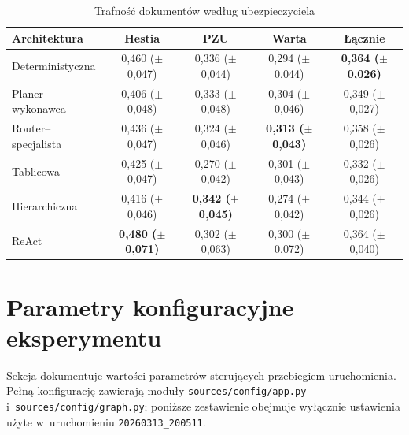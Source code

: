   \begin{table}[H]
    \caption{Trafność dokumentów według ubezpieczyciela}\label{tab:trafnosc-ubezpieczyciel}
    \centering
    \small
    \renewcommand{\arraystretch}{1.3}
    \begin{tabular}{@{} l c c c c @{}}
      \toprule
      \textbf{Architektura}
      & \textbf{Hestia}
      & \textbf{PZU}
      & \textbf{Warta}
      & \textbf{Łącznie}                                                                                                                              \\
      \midrule
      Deterministyczna    & 0{,}460 (\(\pm\) 0{,}047)          & 0{,}336 (\(\pm\) 0{,}044)          & 0{,}294 (\(\pm\) 0{,}044)          & \textbf{0{,}364 (\(\pm\) 0{,}026)} \\
      Planer--wykonawca   & 0{,}406 (\(\pm\) 0{,}048)          & 0{,}333 (\(\pm\) 0{,}048)          & 0{,}304 (\(\pm\) 0{,}046)          & 0{,}349 (\(\pm\) 0{,}027)          \\
      Router--specjalista & 0{,}436 (\(\pm\) 0{,}047)          & 0{,}324 (\(\pm\) 0{,}046)          & \textbf{0{,}313 (\(\pm\) 0{,}043)} & 0{,}358 (\(\pm\) 0{,}026)          \\
      Tablicowa           & 0{,}425 (\(\pm\) 0{,}047)          & 0{,}270 (\(\pm\) 0{,}042)          & 0{,}301 (\(\pm\) 0{,}043)          & 0{,}332 (\(\pm\) 0{,}026)          \\
      Hierarchiczna       & 0{,}416 (\(\pm\) 0{,}046)          & \textbf{0{,}342 (\(\pm\) 0{,}045)} & 0{,}274 (\(\pm\) 0{,}042)          & 0{,}344 (\(\pm\) 0{,}026)          \\
      ReAct               & \textbf{0{,}480 (\(\pm\) 0{,}071)} & 0{,}302 (\(\pm\) 0{,}063)          & 0{,}300 (\(\pm\) 0{,}072)          & 0{,}364 (\(\pm\) 0{,}040)          \\
      \bottomrule
    \end{tabular}
  \end{table}

  \section{Parametry konfiguracyjne eksperymentu}\label{sec:parametry-konfiguracyjne}

  Sekcja dokumentuje wartości parametrów sterujących przebiegiem uruchomienia.
  Pełną konfigurację zawierają moduły \texttt{sources/config/app.py}
  i~\texttt{sources/config/graph.py}; poniższe zestawienie obejmuje wyłącznie
  ustawienia użyte w~uruchomieniu \texttt{20260313\_200511}.

